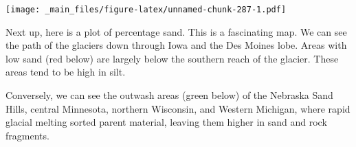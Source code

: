 \documentclass[
]{book}
\newenvironment{Shaded}{\begin{snugshade}}{\end{snugshade}}
\newcommand{\AttributeTok}[1]{\textcolor[rgb]{0.77,0.63,0.00}{#1}}
\newcommand{\DecValTok}[1]{\textcolor[rgb]{0.00,0.00,0.81}{#1}}
\newcommand{\FloatTok}[1]{\textcolor[rgb]{0.00,0.00,0.81}{#1}}
\newcommand{\FunctionTok}[1]{\textcolor[rgb]{0.00,0.00,0.00}{#1}}
\newcommand{\NormalTok}[1]{#1}
\newcommand{\OtherTok}[1]{\textcolor[rgb]{0.56,0.35,0.01}{#1}}
\newcommand{\SpecialCharTok}[1]{\textcolor[rgb]{0.00,0.00,0.00}{#1}}
\newcommand{\StringTok}[1]{\textcolor[rgb]{0.31,0.60,0.02}{#1}}
\begin{document}
\begin{Shaded}
\end{Shaded}

\texttt{[image: \_main\_files/figure-latex/unnamed-chunk-287-1.pdf]}

Next up, here is a plot of percentage sand. This is a fascinating map. We can see the path of the glaciers down through Iowa and the Des Moines lobe. Areas with low sand (red below) are largely below the southern reach of the glacier. These areas tend to be high in silt.

Conversely, we can see the outwash areas (green below) of the Nebraska Sand Hills, central Minnesota, northern Wisconsin, and Western Michigan, where rapid glacial melting sorted parent material, leaving them higher in sand and rock fragments.
\end{document}
